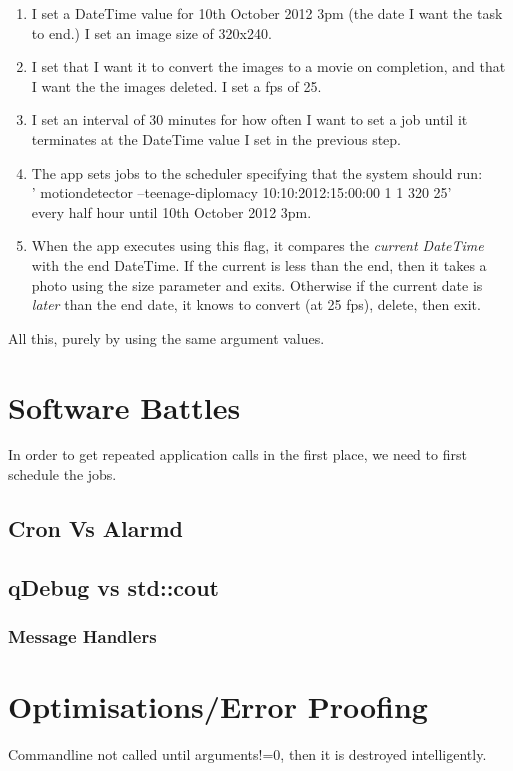 \documentclass[11pt]{article} %
\begin{document}
\begin{enumerate}
\item I set a DateTime value for 10th October 2012 3pm (the date I want the task to end.)  I set an image size of 320x240.\\
\vspace{-20pt}
\item I set that I want it to convert the images to a movie on completion, and that I want the the images deleted. I set a fps of 25.\\
\vspace{-20pt}
\item I set an interval of 30 minutes for how often I want to set a job until it terminates at the DateTime value I set in the previous step.\\
\vspace{-20pt}
\item The app sets jobs to the scheduler specifying that the system should run:\\
 ' motiondetector --teenage-diplomacy 10:10:2012:15:00:00   1  1  320 25' \\
every half hour until 10th October 2012 3pm.
\vspace{-8pt}
\item When the app executes using this flag, it compares the {\it current DateTime} with the end DateTime. If the current is less than the end, then it takes a photo using the size parameter and exits. Otherwise if the current date is {\it later} than the end date, it knows to convert (at 25 fps), delete, then exit.
\end{enumerate}
All this, purely by using the same argument values.

\section{Software Battles}
In order to get repeated application calls in the first place, we need to first schedule the jobs.

\subsection{Cron Vs Alarmd}
\subsection{qDebug vs std::cout}
\subsubsection{Message Handlers}
\section{Optimisations/Error Proofing}
Commandline not called until arguments!=0, then it is destroyed intelligently.
\end{document}
